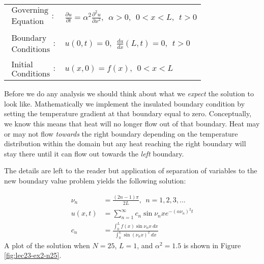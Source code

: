 \begin{table}
\begin{tabular}{l l}
$\substack{\text{Governing} \\\text{Equation}}: $& $\frac{\partial u}{\partial t} = \alpha^2 \frac{\partial^2 u}{\partial x^2}, \ \ \alpha>0, \ \ 0<x<L, \ \ t>0$ \\
& \\
$\substack{\text{Boundary} \\ \text{Conditions}}: $& $u(0,t)=0, \ \ \frac{du}{dx}(L,t) = 0, \ \ t>0$\\
& \\
$\substack{\text{Initial} \\ \text{Conditions}}: $ & $u(x,0) = f(x), \ \ 0<x<L $ \\
\end{tabular}
\end{table}

\vspace{0.25cm}

\noindent Before we do any analysis we should think about what we \emph{expect} the solution to look like.  Mathematically we implement the insulated boundary condition by setting the temperature gradient at that boundary equal to zero.  Conceptually, we know this means that heat will no longer flow out of that boundary.  Heat may or may not flow \emph{towards} the right boundary depending on the temperature distribution within the domain but any heat reaching the right boundary will stay there until it can flow out towards the \emph{left} boundary.

\vspace{0.25cm}
\noindent The details are left to the reader but application of separation of variables to the new boundary value problem yields the following solution:

\begin{align*}
\nu_n &= \frac{(2n-1)\pi}{2L}, \ \ n=1,2,3,\dots \\
u(x,t) &= \sum\limits_{n=1}^{\infty} c_n \sin{\nu_n x}e^{-(\alpha \nu_n)^2 t} \\
c_n &= \frac{\int_0^L f(x) \sin{\nu_n x} \ dx}{\int_0^L \sin{(\nu_n x)}^2 \ dx}
\end{align*}
A plot of the solution when $N=25$, $L=1$, and $\alpha^2=1.5$ is shown in Figure \ref{fig:lec23-ex2-n25}.


